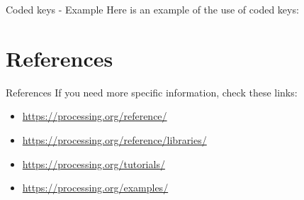\documentclass{beamer}
\begin{document}
\begin{frame}{Coded keys - Example}
Here is an example of the use of coded keys:\\

\lstKeyboardExample
\end{frame}

\section{References}

\begin{frame}{References}
If you need more specific information, check these links:\\

\begin{itemize}
\item{\url{https://processing.org/reference/}}
\item{\url{https://processing.org/reference/libraries/}}
\item{\url{https://processing.org/tutorials/}}
\item{\url{https://processing.org/examples/}}
\end{itemize}
\end{frame}
\end{document}

